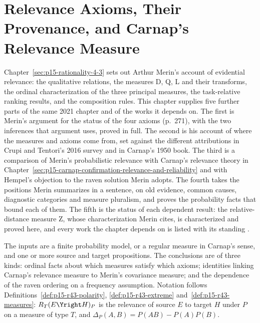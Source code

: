 \chapter{Relevance Axioms, Their Provenance, and Carnap's Relevance Measure}
\label{sec:p15-w02b-p15-024-relevance}

Chapter~\ref{sec:p15-rationality-4-3} sets out Arthur Merin's account of
evidential relevance: the qualitative relations, the measures D, Q, L and
their transforms, the ordinal characterization of the three principal
measures, the task-relative ranking results, and the composition rules.
This chapter supplies five further parts of the same 2021 chapter and
of the works it depends on. The first is Merin's argument for the status
of the four axioms (p.~271), with the two inferences that argument uses,
proved in full. The second is his account of where the measures and
axioms come from, set against the different attributions in Crupi and
Tentori's 2016 survey and in Carnap's 1950 book. The third is a
comparison of Merin's probabilistic relevance with Carnap's relevance
theory in Chapter~\ref{sec:p15-carnap-confirmation-relevance-and-reliability}
and with Hempel's objection to the raven solution Merin adopts. The
fourth takes the positions Merin summarizes in a sentence, on old
evidence, common causes, diagnostic categories and measure pluralism,
and proves the probability facts that bound each of them. The fifth is
the status of each dependent result: the relative-distance
measure Z, whose characterization Merin cites, is characterized and
proved here, and every work the chapter depends on is listed with its
standing \cite[pp.~265--275]{Merin2021Relevance}.

The inputs are a finite probability model, or a regular measure in
Carnap's sense, and one or more source and target propositions. The
conclusions are of three kinds: ordinal facts about which measures
satisfy which axioms; identities linking Carnap's relevance measure to
Merin's covariance measure; and the dependence of the raven ordering on
a frequency assumption. Notation follows
Definitions~\ref{def:p15-r43-polarity}, \ref{def:p15-r43-extreme}
and~\ref{def:p15-r43-measures}: \(R_T(E\Yright H)_P\) is the relevance
of source \(E\) to target \(H\) under \(P\) on a measure of type \(T\),
and \(\Delta_P(A,B)=P(AB)-P(A)P(B)\).

